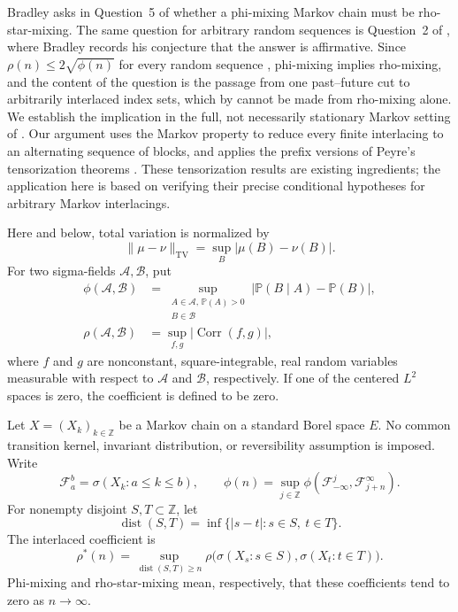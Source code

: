 \documentclass[11pt]{amsart}
\numberwithin{equation}{section}
\theoremstyle{definition}
\newcommand{\PP}{\mathbb P}
\newcommand{\ZZ}{\mathbb Z}
\newcommand{\cF}{\mathcal F}
\newcommand{\TV}{\mathrm{TV}}
\newcommand{\Corr}{\operatorname{Corr}}
\newcommand{\dist}{\operatorname{dist}}
\newcommand{\rhostar}{\rho^{*}}
\begin{document}
Bradley asks in Question~5 of \cite[Section~3, p.~119]{Bradley2005} whether a phi-mixing Markov chain must be rho-star-mixing. The same question for arbitrary random sequences is Question~2 of \cite[Section~2.3]{Bradley2005}, where Bradley records his conjecture \cite[p.~226]{Bradley1997} that the answer is affirmative. Since $\rho(n)\le2\sqrt{\phi(n)}$ for every random sequence \cite[Theorem~17.2.3]{IbragimovLinnik1971}, phi-mixing implies rho-mixing, and the content of the question is the passage from one past--future cut to arbitrarily interlaced index sets, which by \cite{Bradley2001} cannot be made from rho-mixing alone. We establish the implication in the full, not necessarily stationary Markov setting of \cite[Section~3]{Bradley2005}. Our argument uses the Markov property to reduce every finite interlacing to an alternating sequence of blocks, and applies the prefix versions of Peyre's tensorization theorems \cite[Theorems~3.3.1 and~3.3.10; Section~3.4(a)]{Peyre2010}. These tensorization results are existing ingredients; the application here is based on verifying their precise conditional hypotheses for arbitrary Markov interlacings.

Here and below, total variation is normalized by
\begin{equation}\label{eq:tv}
\|\mu-\nu\|_{\TV}=\sup_{B}|\mu(B)-\nu(B)|.
\end{equation}
For two sigma-fields $\mathcal A,\mathcal B$, put
\begin{align}
\phi(\mathcal A,\mathcal B)
 &=\sup_{\substack{A\in\mathcal A,\,\PP(A)>0\\B\in\mathcal B}}
       |\PP(B\mid A)-\PP(B)|,\label{eq:phi-fields}\\
\rho(\mathcal A,\mathcal B)
 &=\sup_{f,g}|\Corr(f,g)|,\label{eq:rho-fields}
\end{align}
where $f$ and $g$ are nonconstant, square-integrable, real random variables measurable with respect to $\mathcal A$ and $\mathcal B$, respectively. If one of the centered $L^2$ spaces is zero, the coefficient is defined to be zero.

Let $X=(X_k)_{k\in\ZZ}$ be a Markov chain on a standard Borel space $E$. No common transition kernel, invariant distribution, or reversibility assumption is imposed. Write
\[
\cF_a^b=\sigma(X_k:a\le k\le b),\qquad
\phi(n)=\sup_{j\in\ZZ}\phi(\cF_{-\infty}^{j},\cF_{j+n}^{\infty}).
\]
For nonempty disjoint $S,T\subset\ZZ$, let
\[
\dist(S,T)=\inf\{|s-t|:s\in S,\ t\in T\}.
\]
The interlaced coefficient is
\begin{equation}\label{eq:rhostar-def}
\rhostar(n)=\sup_{\dist(S,T)\ge n}
\rho\bigl(\sigma(X_s:s\in S),\sigma(X_t:t\in T)\bigr).
\end{equation}
Phi-mixing and rho-star-mixing mean, respectively, that these coefficients tend to zero as $n\to\infty$.
\end{document}
